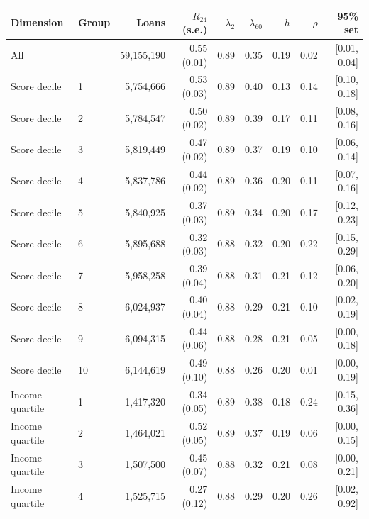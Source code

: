 \begin{tabular}{llrrrrrrr}
\toprule
Dimension & Group & Loans & $R_{24}$ (s.e.) & $\lambda_{2}$ & $\lambda_{60}$ & $h$ & $\rho$ & 95\% set \\
\midrule
All &  & 59,155,190 & 0.55 (0.01) & 0.89 & 0.35 & 0.19 & 0.02 & [0.01, 0.04] \\
Score decile & 1 & 5,754,666 & 0.53 (0.03) & 0.89 & 0.40 & 0.13 & 0.14 & [0.10, 0.18] \\
Score decile & 2 & 5,784,547 & 0.50 (0.02) & 0.89 & 0.39 & 0.17 & 0.11 & [0.08, 0.16] \\
Score decile & 3 & 5,819,449 & 0.47 (0.02) & 0.89 & 0.37 & 0.19 & 0.10 & [0.06, 0.14] \\
Score decile & 4 & 5,837,786 & 0.44 (0.02) & 0.89 & 0.36 & 0.20 & 0.11 & [0.07, 0.16] \\
Score decile & 5 & 5,840,925 & 0.37 (0.03) & 0.89 & 0.34 & 0.20 & 0.17 & [0.12, 0.23] \\
Score decile & 6 & 5,895,688 & 0.32 (0.03) & 0.88 & 0.32 & 0.20 & 0.22 & [0.15, 0.29] \\
Score decile & 7 & 5,958,258 & 0.39 (0.04) & 0.88 & 0.31 & 0.21 & 0.12 & [0.06, 0.20] \\
Score decile & 8 & 6,024,937 & 0.40 (0.04) & 0.88 & 0.29 & 0.21 & 0.10 & [0.02, 0.19] \\
Score decile & 9 & 6,094,315 & 0.44 (0.06) & 0.88 & 0.28 & 0.21 & 0.05 & [0.00, 0.18] \\
Score decile & 10 & 6,144,619 & 0.49 (0.10) & 0.88 & 0.26 & 0.20 & 0.01 & [0.00, 0.19] \\
Income quartile & 1 & 1,417,320 & 0.34 (0.05) & 0.89 & 0.38 & 0.18 & 0.24 & [0.15, 0.36] \\
Income quartile & 2 & 1,464,021 & 0.52 (0.05) & 0.89 & 0.37 & 0.19 & 0.06 & [0.00, 0.15] \\
Income quartile & 3 & 1,507,500 & 0.45 (0.07) & 0.88 & 0.32 & 0.21 & 0.08 & [0.00, 0.21] \\
Income quartile & 4 & 1,525,715 & 0.27 (0.12) & 0.88 & 0.29 & 0.20 & 0.26 & [0.02, 0.92] \\
\bottomrule
\end{tabular}
